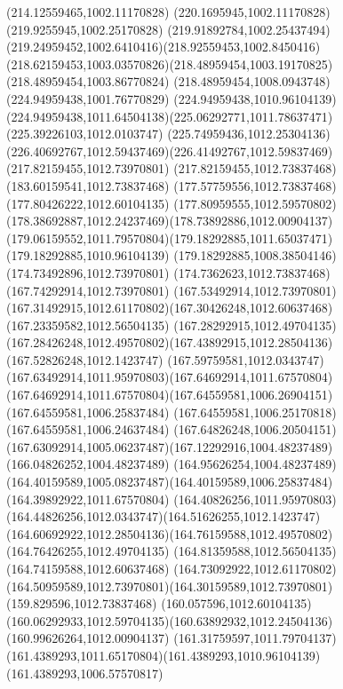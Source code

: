 {{		\lineto(214.12559465,1002.11170828)
		\lineto(220.1695945,1002.11170828)
		\lineto(219.9255945,1002.25170828)
		\curveto(219.91892784,1002.25437494)(219.24959452,1002.6410416)(218.92559453,1002.8450416)
		\curveto(218.62159453,1003.03570826)(218.48959454,1003.19170825)(218.48959454,1003.86770824)
		\lineto(218.48959454,1008.0943748)
		\lineto(224.94959438,1001.76770829)
		\lineto(224.94959438,1010.96104139)
		\curveto(224.94959438,1011.64504138)(225.06292771,1011.78637471)(225.39226103,1012.0103747)
		\curveto(225.74959436,1012.25304136)(226.40692767,1012.59437469)(226.41492767,1012.59837469)
		\closepath
		\moveto(217.82159455,1012.73970801)
		\lineto(217.82159455,1012.73837468)
		\closepath
		\moveto(183.60159541,1012.73837468)
		\lineto(177.57759556,1012.73837468)
		\lineto(177.80426222,1012.60104135)
		\curveto(177.80959555,1012.59570802)(178.38692887,1012.24237469)(178.73892886,1012.00904137)
		\curveto(179.06159552,1011.79570804)(179.18292885,1011.65037471)(179.18292885,1010.96104139)
		\lineto(179.18292885,1008.38504146)
		\lineto(174.73492896,1012.73970801)
		\lineto(174.7362623,1012.73837468)
		\lineto(167.74292914,1012.73970801)
		\curveto(167.53492914,1012.73970801)(167.31492915,1012.61170802)(167.30426248,1012.60637468)
		\lineto(167.23359582,1012.56504135)
		\lineto(167.28292915,1012.49704135)
		\curveto(167.28426248,1012.49570802)(167.43892915,1012.28504136)(167.52826248,1012.1423747)
		\curveto(167.59759581,1012.0343747)(167.63492914,1011.95970803)(167.64692914,1011.67570804)
		\curveto(167.64692914,1011.67570804)(167.64559581,1006.26904151)(167.64559581,1006.25837484)
		\lineto(167.64559581,1006.25170818)
		\lineto(167.64559581,1006.24637484)
		\lineto(167.64826248,1006.20504151)
		\curveto(167.63092914,1005.06237487)(167.12292916,1004.48237489)(166.04826252,1004.48237489)
		\curveto(164.95626254,1004.48237489)(164.40159589,1005.08237487)(164.40159589,1006.25837484)
		\lineto(164.39892922,1011.67570804)
		\curveto(164.40826256,1011.95970803)(164.44826256,1012.0343747)(164.51626255,1012.1423747)
		\curveto(164.60692922,1012.28504136)(164.76159588,1012.49570802)(164.76426255,1012.49704135)
		\lineto(164.81359588,1012.56504135)
		\lineto(164.74159588,1012.60637468)
		\curveto(164.73092922,1012.61170802)(164.50959589,1012.73970801)(164.30159589,1012.73970801)
		\lineto(159.829596,1012.73837468)
		\lineto(160.057596,1012.60104135)
		\curveto(160.06292933,1012.59704135)(160.63892932,1012.24504136)(160.99626264,1012.00904137)
		\curveto(161.31759597,1011.79704137)(161.4389293,1011.65170804)(161.4389293,1010.96104139)
		\lineto(161.4389293,1006.57570817)
}}
